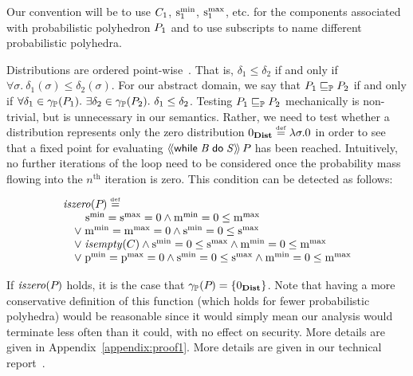 Our convention will be to use $C_{1}$, $\mathrm{s}^\mathrm{min}_{1}$, $\mathrm{s}^\mathrm{max}_{1}$,
etc. for the components associated with probabilistic polyhedron
$P_{1}$ and to use subscripts to name different probabilistic
polyhedra.


Distributions are ordered point-wise~\cite{clarkson09quantifying}.
That is, $\delta_1 \leq \delta_2$ if and only if $\forall
\sigma.\ \delta_1(\sigma) \leq \delta_2(\sigma)$.  For
our abstract domain, we say that $P_{1} \sqsubseteq_{\mathbb{P}} P_{2}$ if and only if
$\forall \delta_1 \in \gamma_{\mathbb{P}}(P_{1}).\ \exists \delta_2 \in
\gamma_{\mathbb{P}}(P_{2}).\ \delta_1 \leq \delta_2$.  Testing $P_{1} \sqsubseteq_{\mathbb{P}}
P_{2}$ mechanically is non-trivial, but is unnecessary in our
semantics.  Rather, we need to test whether a distribution
represents only the zero distribution $0_{\textbf{Dist}} \stackrel{\smash{\scriptscriptstyle \mathrm{def}}}= \lambda
\sigma. 0$ in order to see that a fixed point for evaluating
$\langle\!\langle{\mathsf{while}\;{\mathit{B}}\;\mathsf{do}\;{\mathit{S}}}\rangle\!\rangle\,{P_{}}$ has been reached.
Intuitively, no further iterations of the loop need to be considered
once the probability mass flowing into the $n^\text{th}$ iteration is
zero. This condition can be detected as follows:

\vspace*{-0.9em}
\begin{small}
\[
\begin{array}{l}
\mathit{iszero}(P_{}) \stackrel{\smash{\scriptscriptstyle \mathrm{def}}}= \\
\qquad \mathrm{s}^\mathrm{min}_{} = \mathrm{s}^\mathrm{max}_{} = 0 \wedge \mathrm{m}^\mathrm{min}_{} = 0 \leq \mathrm{m}^\mathrm{max}_{} \\
\quad \vee\; \mathrm{m}^\mathrm{min}_{} = \mathrm{m}^\mathrm{max}_{} = 0 \wedge \mathrm{s}^\mathrm{min}_{} = 0 \leq \mathrm{s}^\mathrm{max}_{} \\
\quad \vee\; \mathit{isempty}(C) \wedge \mathrm{s}^\mathrm{min}_{} = 0 \leq \mathrm{s}^\mathrm{max}_{} \wedge
\mathrm{m}^\mathrm{min}_{} = 0 \leq \mathrm{m}^\mathrm{max}_{} \\
\quad \vee\; \mathrm{p}^\mathrm{min}_{} = \mathrm{p}^\mathrm{max}_{} = 0 \wedge \mathrm{s}^\mathrm{min}_{} = 0 \leq \mathrm{s}^\mathrm{max}_{} \wedge
\mathrm{m}^\mathrm{min}_{} = 0 \leq \mathrm{m}^\mathrm{max}_{} \\
\end{array}
\]
\end{small}
If $ \mathit{iszero}(P_{}) $ holds, it is the case that $ \gamma_{\mathbb{P}}(P_{}) =
\left\{ 0_{\textbf{Dist}} \right\} $. Note that having a more conservative
definition of this function (which holds for fewer probabilistic polyhedra)
would be reasonable since it would simply
mean our analysis would terminate less often than it could, with no
effect on security.  \iffull More details are given in Appendix~\ref{appendix:proof1}.
\else More details are given in our technical report~\cite{TR}. \fi

